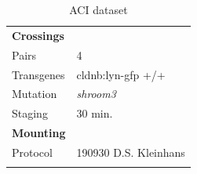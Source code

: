 \documentclass[11pt,singlespacinge,twoside]{reedthesis} %
\begin{document}
\begin{longtable}[]{@{}ll@{}}
\caption{\label{tab:acidata} ACI dataset}\tabularnewline
\toprule
\endhead
\begin{minipage}[t]{0.21\columnwidth}\raggedright
\textbf{Crossings}\strut
\end{minipage} & \begin{minipage}[t]{0.73\columnwidth}\raggedright
\strut
\end{minipage}\tabularnewline
\begin{minipage}[t]{0.21\columnwidth}\raggedright
Pairs\strut
\end{minipage} & \begin{minipage}[t]{0.73\columnwidth}\raggedright
4\strut
\end{minipage}\tabularnewline
\begin{minipage}[t]{0.21\columnwidth}\raggedright
Transgenes\strut
\end{minipage} & \begin{minipage}[t]{0.73\columnwidth}\raggedright
cldnb:lyn-gfp +/+\strut
\end{minipage}\tabularnewline
\begin{minipage}[t]{0.21\columnwidth}\raggedright
Mutation\strut
\end{minipage} & \begin{minipage}[t]{0.73\columnwidth}\raggedright
\emph{shroom3}\strut
\end{minipage}\tabularnewline
\begin{minipage}[t]{0.21\columnwidth}\raggedright
Staging\strut
\end{minipage} & \begin{minipage}[t]{0.73\columnwidth}\raggedright
30 min.\strut
\end{minipage}\tabularnewline
\begin{minipage}[t]{0.21\columnwidth}\raggedright
\textbf{Mounting}\strut
\end{minipage} & \begin{minipage}[t]{0.73\columnwidth}\raggedright
\strut
\end{minipage}\tabularnewline
\begin{minipage}[t]{0.21\columnwidth}\raggedright
Protocol\strut
\end{minipage} & \begin{minipage}[t]{0.73\columnwidth}\raggedright
190930 D.S. Kleinhans\strut
\end{minipage}\tabularnewline
\begin{minipage}[t]{0.21\columnwidth}\raggedright

\end{minipage}
\end{longtable}
\end{document}

